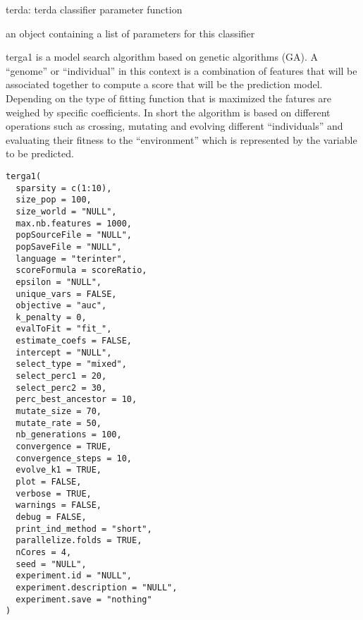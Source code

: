 \documentclass[a4paper]{book}
\begin{document}
%
\begin{Details}
terda: terda classifier parameter function
\end{Details}
%
\begin{Value}
an object containing a list of parameters for this classifier
\end{Value}
%
\begin{Description}
terga1 is a model search algorithm based on genetic algorithms (GA). A “genome” or “individual” in this context is a combination of features that will be associated together to compute a score that will be the prediction model. Depending on the type of fitting function that is maximized the fatures are weighed by specific coefficients. In short the algorithm is based on different operations such as crossing, mutating and evolving different “individuals” and evaluating their fitness to the “environment” which is represented by the variable to be predicted.
\end{Description}
%
\begin{Usage}
\begin{verbatim}
terga1(
  sparsity = c(1:10),
  size_pop = 100,
  size_world = "NULL",
  max.nb.features = 1000,
  popSourceFile = "NULL",
  popSaveFile = "NULL",
  language = "terinter",
  scoreFormula = scoreRatio,
  epsilon = "NULL",
  unique_vars = FALSE,
  objective = "auc",
  k_penalty = 0,
  evalToFit = "fit_",
  estimate_coefs = FALSE,
  intercept = "NULL",
  select_type = "mixed",
  select_perc1 = 20,
  select_perc2 = 30,
  perc_best_ancestor = 10,
  mutate_size = 70,
  mutate_rate = 50,
  nb_generations = 100,
  convergence = TRUE,
  convergence_steps = 10,
  evolve_k1 = TRUE,
  plot = FALSE,
  verbose = TRUE,
  warnings = FALSE,
  debug = FALSE,
  print_ind_method = "short",
  parallelize.folds = TRUE,
  nCores = 4,
  seed = "NULL",
  experiment.id = "NULL",
  experiment.description = "NULL",
  experiment.save = "nothing"
)
\end{verbatim}
\end{Usage}
%
\end{document}
